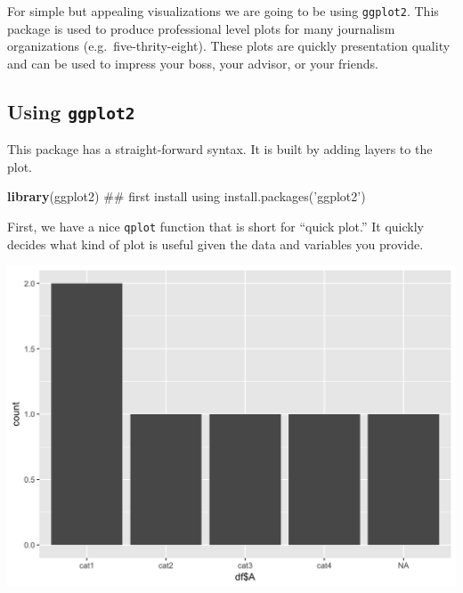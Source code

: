 \documentclass[]{tufte-book}
\newenvironment{Shaded}{}{}
\newcommand{\KeywordTok}[1]{\textcolor[rgb]{0.00,0.44,0.13}{\textbf{#1}}}
\newcommand{\OperatorTok}[1]{\textcolor[rgb]{0.40,0.40,0.40}{#1}}
\newcommand{\NormalTok}[1]{#1}
\theoremstyle{definition}
\theoremstyle{definition}
\theoremstyle{remark}
\begin{document}
For simple but appealing visualizations we are going to be using
\texttt{ggplot2}. This package is used to produce professional level
plots for many journalism organizations (e.g.~five-thrity-eight). These
plots are quickly presentation quality and can be used to impress your
boss, your advisor, or your friends.

\subsection*{\texorpdfstring{Using
\texttt{ggplot2}}{Using ggplot2}}\label{using-ggplot2}

This package has a straight-forward syntax. It is built by adding layers
to the plot.

\begin{Shaded}
\begin{Highlighting}[]
\KeywordTok{library}\NormalTok{(ggplot2)  ## first install using install.packages('ggplot2')}
\end{Highlighting}
\end{Shaded}

First, we have a nice \texttt{qplot} function that is short for ``quick
plot.'' It quickly decides what kind of plot is useful given the data
and variables you provide.

\begin{Shaded}
\end{Shaded}

\includegraphics{_main_files/figure-latex/unnamed-chunk-57-1}
\end{document}
